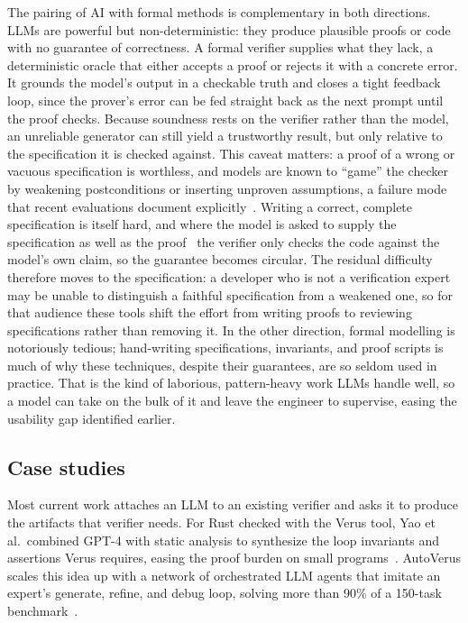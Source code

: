 \documentclass[conference]{IEEEtran}
\begin{document}
The pairing of AI with formal methods is complementary in both directions. LLMs are powerful but non-deterministic: they produce plausible proofs or code with no guarantee of correctness. A formal verifier supplies what they lack, a deterministic oracle that either accepts a proof or rejects it with a concrete error. It grounds the model's output in a checkable truth and closes a tight feedback loop, since the prover's error can be fed straight back as the next prompt until the proof checks. Because soundness rests on the verifier rather than the model, an unreliable generator can still yield a trustworthy result, but only relative to the specification it is checked against. This caveat matters: a proof of a wrong or vacuous specification is worthless, and models are known to ``game'' the checker by weakening postconditions or inserting unproven assumptions, a failure mode that recent evaluations document explicitly~\cite{bayazit2025casestudy}. Writing a correct, complete specification is itself hard, and where the model is asked to supply the specification as well as the proof~\cite{misu2024dafny} the verifier only checks the code against the model's own claim, so the guarantee becomes circular. The residual difficulty therefore moves to the specification: a developer who is not a verification expert may be unable to distinguish a faithful specification from a weakened one, so for that audience these tools shift the effort from writing proofs to reviewing specifications rather than removing it. In the other direction, formal modelling is notoriously tedious; hand-writing specifications, invariants, and proof scripts is much of why these techniques, despite their guarantees, are so seldom used in practice. That is the kind of laborious, pattern-heavy work LLMs handle well, so a model can take on the bulk of it and leave the engineer to supervise, easing the usability gap identified earlier.

\subsection{Case studies}

Most current work attaches an LLM to an existing verifier and asks it to produce the artifacts that verifier needs. For Rust checked with the Verus tool, Yao et al.\ combined GPT-4 with static analysis to synthesize the loop invariants and assertions Verus requires, easing the proof burden on small programs~\cite{yao2023rustproof}. AutoVerus scales this idea up with a network of orchestrated LLM agents that imitate an expert's generate, refine, and debug loop, solving more than 90\% of a 150-task benchmark~\cite{yang2024autoverus}.
\end{document}

